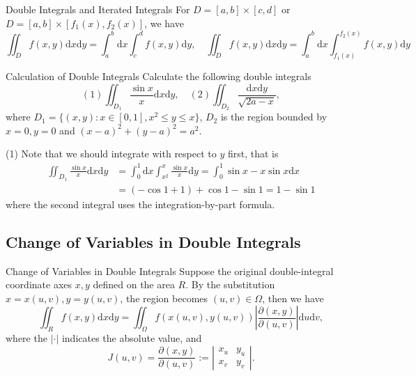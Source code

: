 \begin{proposition}{Double Integrals and Iterated Integrals}{}
  For $D = [a, b] \times [c, d]$ or $D = [a, b] \times [f_1(x), f_2(x)]$,
  we have
  \begin{equation}
    \iint_Df(x,y)\mathrm{d}x\mathrm{d}y=\int_a^b\mathrm{d}x\int_c^df(x,y)\mathrm{d}y,\quad
    \iint_Df(x,y)\mathrm{d}x\mathrm{d}y=\int_a^b\mathrm{d}x\int_{f_1(x)}^{f_2(x)}f(x,y)\mathrm{d}y
  \end{equation}
\end{proposition}

\begin{example}{Calculation of Double Integrals}{}
  Calculate the following double integrals
  \begin{equation}
    (1) \iint_{D_1} \frac{\sin x}{x}\mathrm{d} x\mathrm{d}y, \quad
    (2) \iint_{D_2} \frac{\mathrm{d}x\mathrm{d}y}{\sqrt{2a - x}},
  \end{equation}
  where $D_1 = \{(x, y): x \in [0, 1], x^2 \leq y \leq x\}$,
  $D_2$ is the region bounded by $x=0, y=0$ and $(x-a)^2 + (y-a)^2 = a^2$.
\end{example}

\begin{solution}
  (1) Note that we should integrate with respect to $y$ first, that is
  \begin{align}
    \iint_{D_1} \frac{\sin x}{x}\mathrm{d} x \mathrm{d} y
    &= \int_0^1 \mathrm{d} x \int_{x^2}^x \frac{\sin x}{x} \mathrm{d} y
    = \int_0^1 \sin x - x\sin x\mathrm{d} x\\
    &= (-\cos 1 + 1) + \cos 1 - \sin 1
      = 1 - \sin 1
  \end{align}
  where the second integral uses the integration-by-part formula.
\end{solution}

\subsection{Change of Variables in Double Integrals}

\begin{proposition}{Change of Variables in Double Integrals}{}
  Suppose the original double-integral coordinate axes $x, y$ defined on the
  area $R$.
  By the substitution $x = x(u, v), y = y(u, v)$, the region becomes $(u, v) \in
  \Omega$, then we have
  \begin{equation}
    \iint_Rf(x,y)\mathrm{d}x\mathrm{d}y=\iint_\Omega f(x(u,v),y(u,v))\left|\frac{\partial(x,y)}{\partial(u,v)}\right|\mathrm{d}u\mathrm{d}v,
  \end{equation}
  where the $|\cdot|$ indicates the absolute value, and
  \begin{equation}
    J(u,v) = \frac{\partial (x, y)}{\partial (u, v)} := \left|
      \begin{array}{cc}
        x_u&y_u\\
        x_v&y_v
      \end{array}
    \right|.
  \end{equation}
\end{proposition}

